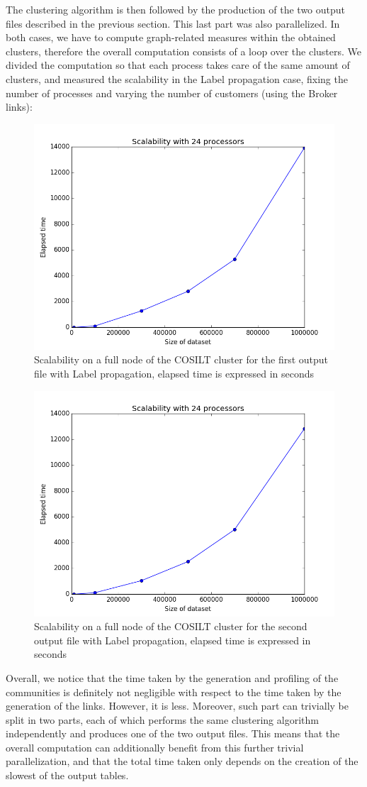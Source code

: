 \documentclass[a4paper,11pt]{book}
\begin{document}
The clustering algorithm is then followed by the production of the two output files described in the previous section. This last part was also parallelized. In both cases, we have to compute graph-related measures within the obtained clusters, therefore the overall computation consists of a loop over the clusters. We divided the computation so that each process takes care of the same amount of clusters, and measured the scalability in the Label propagation case, fixing the number of processes and varying the number of customers (using the Broker links):
  \begin{figure}[H]
\centering
\includegraphics[height=6.125 cm,width=8.75 cm]{24cores_table1.png}
\caption{Scalability on a full node of the COSILT cluster for the first output file with Label propagation, elapsed time is expressed in seconds} \label{fig:tab1}
\end{figure}
 \begin{figure}[H]
\centering
\includegraphics[height=6.125 cm,width=8.75 cm]{24cores_table4.png}
\caption{Scalability on a full node of the COSILT cluster for the second output file with Label propagation, elapsed time is expressed in seconds} \label{fig:tab4}
\end{figure}
Overall, we notice that the time taken by the generation and profiling of the communities is definitely not negligible with respect to the time taken by the generation of the links. However, it is less.
Moreover, such part can trivially be split in two parts, each of which performs the same clustering algorithm independently and produces one of the two output files. This means that the overall computation can additionally benefit from this further trivial parallelization, and that the total time taken only depends on the creation of the slowest of the output tables.\\
\end{document}
